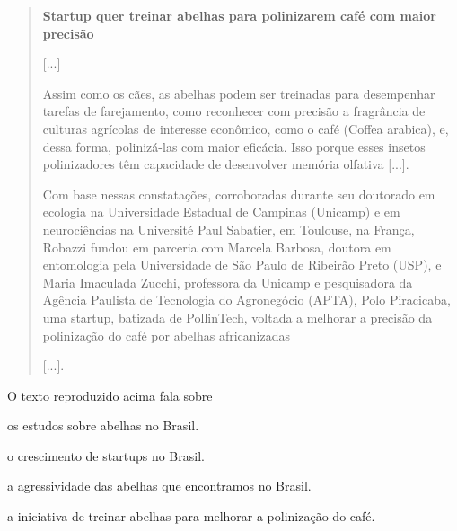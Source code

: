 \begin{quote}
\textbf{Startup quer treinar abelhas para polinizarem café com maior precisão}

{[}...{]}

Assim como os cães, as abelhas podem ser treinadas para desempenhar
tarefas de farejamento, como reconhecer com precisão a fragrância de
culturas agrícolas de interesse econômico, como o café (Coffea arabica),
e, dessa forma, polinizá-las com maior eficácia. Isso porque esses
insetos polinizadores têm capacidade de desenvolver memória olfativa
{[}...{]}.

Com base nessas constatações, corroboradas durante seu doutorado em
ecologia na Universidade Estadual de Campinas (Unicamp) e em
neurociências na Université Paul Sabatier, em Toulouse, na França,
Robazzi fundou em parceria com Marcela Barbosa, doutora em entomologia
pela Universidade de São Paulo de Ribeirão Preto (USP), e Maria
Imaculada Zucchi, professora da Unicamp e pesquisadora da Agência
Paulista de Tecnologia do Agronegócio (APTA), Polo Piracicaba, uma
startup, batizada de PollinTech, voltada a melhorar a precisão da
polinização do café por abelhas africanizadas

{[}...{]}.

\end{quote}

O texto reproduzido acima fala sobre

\begin{escolha}
\item os estudos sobre abelhas no Brasil.

\item o crescimento de startups no Brasil.

\item a agressividade das abelhas que encontramos no Brasil.

\item a iniciativa de treinar abelhas para melhorar a polinização do café.
\end{escolha}


